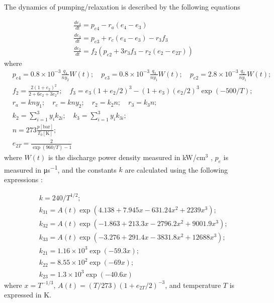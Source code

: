 \documentclass{report}
\begin{document}
The dynamics of pumping/relaxation is described by the following equations

\begin{equation}\label{eq:dedt}
\begin{aligned}
&\frac{d e_4}{dt} = p_{e4} - r_a (e_4 - e_3)\\
&\frac{d e_3}{dt} = p_{e3} + r_c(e_4 - e_3) - r_3 f_3\\
&\frac{d e_2}{dt} = f_2 \left( p_{e2} + 3 r_3 f_3 - r_2 (e_2 - e_{2T}) \right)
\end{aligned}
\end{equation}
where
\begin{equation}\label{eq:dedt_rates}
\begin{aligned}
&p_{e4} = 0.8\times 10^{-3} \frac{q_4}{n y_2} W(t);\quad p_{e3} = 0.8\times 10^{-3}\frac{q_3}{n y_1} W(t);\quad p_{e2} = 2.8\times 10^{-3}\frac{q_2}{n y_1} W(t);\\
&f_2 = \frac{2(1+e_2)^2}{2+6e_2+3{e_2}^2};\quad f_3 = e_3(1+e_2/2)^3 - (1+e_3)(e_2/2)^3 \exp(- 500/T);\\
&r_a = kny_1;\quad r_c = kny_2;\quad r_2 = k_2n;\quad r_3 = k_3n;\\
&k_2 = \sum\limits_{i=1}^3 y_i k_{2i};\quad k_3 = \sum\limits_{i=1}^3 y_i k_{3i};\\
&n = 273 \frac{p[\text{bar}]}{T_0[\text{K}]};\\
&e_{2T} = \frac{2}{\exp(960/T)-1}
\end{aligned}
\end{equation}
where $W(t)$ is the discharge power density measured in {kW/cm$^3$} , $p_e$ is measured in \si{\micro\second^{-1}}, and the constants $k$ are calculated using the following expressions \cite{Biryukov-1974,Taylor-1969}:

\begin{equation}
\begin{aligned}
&k = 240 / T^{1/2};\\
&k_{31} = A(t)\exp(4.138 + 7.945x - 631.24x^2 + 2239x^3);\\
&k_{32} = A(t)\exp(-1.863 + 213.3x - 2796.2x^2 + 9001.9x^3);\\
&k_{33} = A(t)\exp(-3.276 + 291.4x - 3831.8x^2 + 12688x^3);\\
&k_{21} = 1.16 \times 10^3 \exp(-59.3x);\\
&k_{22} = 8.55 \times 10^2 \exp(-69x);\\
&k_{23} = 1.3 \times 10^3 \exp(-40.6x)
\end{aligned}
\end{equation}
where $x=T^{-1/3}$, $A(t)=(T/273)(1+e_{2T}/2)^{-3}$, and temperature $T$ is expressed in K.
\end{document}
